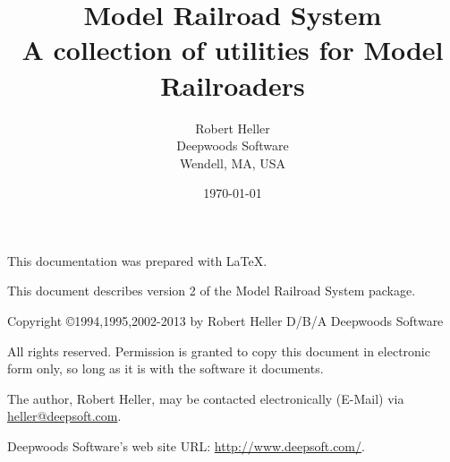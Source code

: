 \title{Model Railroad System \\ A collection of utilities for Model Railroaders\\ \MRRSubTitle}
\author{Robert Heller \\ Deepwoods Software \\ Wendell, MA, USA}
\date{\today}
\begin{titlepage}

\maketitle


\clearpage


This documentation was prepared with \LaTeX.

This document describes version 2 of the Model Railroad System package.

\vspace{.25in}



{\small Copyright \copyright 1994,1995,2002-2013 by Robert Heller D/B/A Deepwoods
Software}

\vspace{.25in}

All rights reserved.  Permission is granted to copy this document in
electronic form only, so long as it is with the software it
documents. 

\vspace{.125in}

The author, Robert Heller, may be contacted electronically (E-Mail) via
\url{heller@deepsoft.com}.

\vspace{.25in}

Deepwoods Software's web site URL: \url{http://www.deepsoft.com/}.

\thispagestyle{empty}
\setcounter{page}{0}
\clearpage

\end{titlepage}

